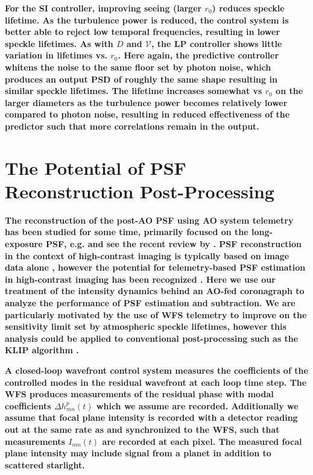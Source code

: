 \documentclass[10pt,preprint]{aastex631}
\begin{document}
\textbf{For the SI controller, improving seeing (larger $r_0$) reduces speckle lifetime.  As the turbulence power is reduced, the control system is better able to reject low temporal frequencies, resulting in lower speckle lifetimes.  As with $D$ and $\mathcal{V}$, the LP controller shows little variation in lifetimes vs. $r_0$.  Here again, the predictive controller whitens the noise to the same floor set by photon noise, which produces an output PSD of roughly the same shape resulting in similar speckle lifetimes.  The lifetime increases somewhat vs $r_0$ on the larger diameters as the turbulence power becomes relatively lower compared to photon noise, resulting in reduced effectiveness of the predictor such that more correlations remain in the output. }


\section{The Potential of \textbf{PSF} Reconstruction Post-Processing}
\label{sec:reconstruction}
\textbf{The reconstruction of the post-AO PSF using AO system telemetry has been studied for some time, primarily focused on the long-exposure PSF, e.g. \citet{1997JOSAA..14.3057V} and see the recent review by \citet{2020SPIE11448E..0AB}.  PSF reconstruction in the context of high-contrast imaging is typically based on image data alone \citep{2006ApJ...641..556M,2007ApJ...660..770L}, however the potential for telemetry-based PSF estimation in high-contrast imaging has been recognized \citep{2013ApJ...767...21F,2013ApJ...767..100C}. Here we use our treatment of the intensity dynamics behind an AO-fed coronagraph to analyze the performance of PSF estimation and subtraction.  We are particularly motivated by the use of WFS telemetry to improve on the sensitivity limit set by atmospheric speckle lifetimes, however this analysis could be applied to conventional post-processing such as the KLIP algorithm \citep{2012ApJ...755L..28S}.}

\textbf{A closed-loop wavefront control system measures the coefficients of the controlled modes in the residual wavefront at each loop time step.  The WFS produces measurements of the residual phase with modal coefficients $\Delta h_{mn}^{p}(t)$ which we assume are recorded. Additionally we assume that focal plane intensity is recorded with a detector reading out at the same rate as and synchronized to the WFS, such that measurements $I_{mn}(t)$ are recorded at each pixel. The measured focal plane intensity may include signal from a planet in addition to scattered starlight.}
\end{document}
